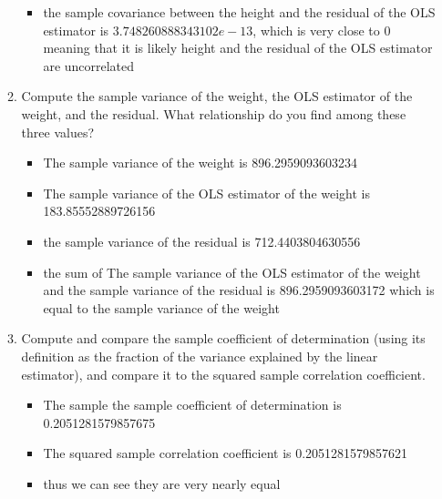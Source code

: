 \documentclass[12pt,twoside]{article}
\begin{document}
\begin{enumerate}
\begin{enumerate}
    \begin{itemize}
        \item the sample covariance between the height and the residual of the OLS estimator is $3.748260888343102e-13$, which is very close to 0 meaning that it is likely height and the residual of the OLS estimator are uncorrelated
    \end{itemize}
	\item Compute the sample variance of the weight, the OLS estimator of the weight, and the residual. What relationship do you find among these three values?
    \begin{itemize}
        \item The sample variance of the weight is 896.2959093603234
\item The sample variance of the OLS estimator of the weight is 183.85552889726156
\item the sample variance of the residual is 712.4403804630556
\item the sum of The sample variance of the OLS estimator of the weight and the sample variance of the residual is 896.2959093603172 which is equal to the sample variance of the weight
    \end{itemize}
	\item Compute and compare the sample coefficient of determination (using its definition as the fraction of the variance explained by the linear estimator), and compare it to the squared sample correlation coefficient.
 \begin{itemize}
     \item The sample the sample coefficient of determination is 0.2051281579857675
\item The squared sample correlation coefficient is 0.2051281579857621
 \item thus we can see they are very nearly equal
 \end{itemize}
\end{enumerate}


\end{enumerate}
\end{document}
